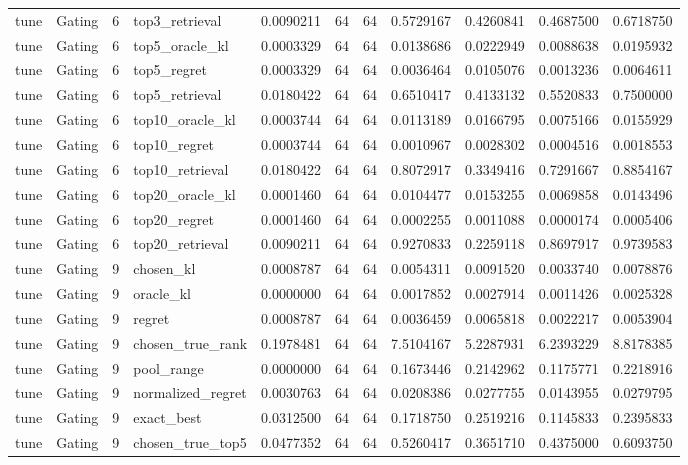 \begin{tabular}{llrlrrrrrrr}
tune & Gating & 6 & top3_retrieval & 0.0090211 & 64 & 64 & 0.5729167 & 0.4260841 & 0.4687500 & 0.6718750 \\
tune & Gating & 6 & top5_oracle_kl & 0.0003329 & 64 & 64 & 0.0138686 & 0.0222949 & 0.0088638 & 0.0195932 \\
tune & Gating & 6 & top5_regret & 0.0003329 & 64 & 64 & 0.0036464 & 0.0105076 & 0.0013236 & 0.0064611 \\
tune & Gating & 6 & top5_retrieval & 0.0180422 & 64 & 64 & 0.6510417 & 0.4133132 & 0.5520833 & 0.7500000 \\
tune & Gating & 6 & top10_oracle_kl & 0.0003744 & 64 & 64 & 0.0113189 & 0.0166795 & 0.0075166 & 0.0155929 \\
tune & Gating & 6 & top10_regret & 0.0003744 & 64 & 64 & 0.0010967 & 0.0028302 & 0.0004516 & 0.0018553 \\
tune & Gating & 6 & top10_retrieval & 0.0180422 & 64 & 64 & 0.8072917 & 0.3349416 & 0.7291667 & 0.8854167 \\
tune & Gating & 6 & top20_oracle_kl & 0.0001460 & 64 & 64 & 0.0104477 & 0.0153255 & 0.0069858 & 0.0143496 \\
tune & Gating & 6 & top20_regret & 0.0001460 & 64 & 64 & 0.0002255 & 0.0011088 & 0.0000174 & 0.0005406 \\
tune & Gating & 6 & top20_retrieval & 0.0090211 & 64 & 64 & 0.9270833 & 0.2259118 & 0.8697917 & 0.9739583 \\
tune & Gating & 9 & chosen_kl & 0.0008787 & 64 & 64 & 0.0054311 & 0.0091520 & 0.0033740 & 0.0078876 \\
tune & Gating & 9 & oracle_kl & 0.0000000 & 64 & 64 & 0.0017852 & 0.0027914 & 0.0011426 & 0.0025328 \\
tune & Gating & 9 & regret & 0.0008787 & 64 & 64 & 0.0036459 & 0.0065818 & 0.0022217 & 0.0053904 \\
tune & Gating & 9 & chosen_true_rank & 0.1978481 & 64 & 64 & 7.5104167 & 5.2287931 & 6.2393229 & 8.8178385 \\
tune & Gating & 9 & pool_range & 0.0000000 & 64 & 64 & 0.1673446 & 0.2142962 & 0.1175771 & 0.2218916 \\
tune & Gating & 9 & normalized_regret & 0.0030763 & 64 & 64 & 0.0208386 & 0.0277755 & 0.0143955 & 0.0279795 \\
tune & Gating & 9 & exact_best & 0.0312500 & 64 & 64 & 0.1718750 & 0.2519216 & 0.1145833 & 0.2395833 \\
tune & Gating & 9 & chosen_true_top5 & 0.0477352 & 64 & 64 & 0.5260417 & 0.3651710 & 0.4375000 & 0.6093750 \\

\end{tabular}
